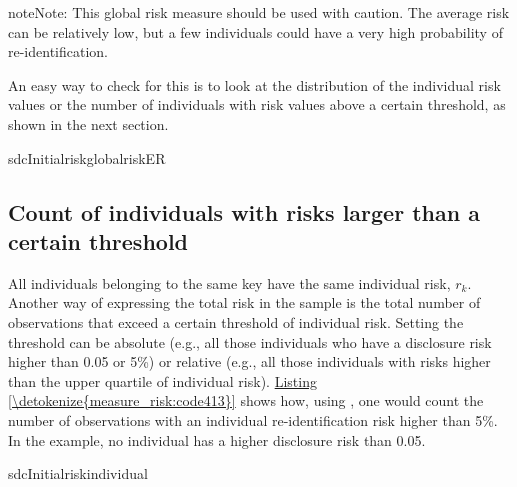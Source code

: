 \documentclass[letterpaper,10pt,english]{sphinxmanual}
\begin{document}
\begin{sphinxadmonition}{note}{Note:}
This global risk measure should be used with
caution. The average risk can be relatively low, but a few individuals
could have a very high probability of re-identification.
\end{sphinxadmonition}

An easy way to check for this is to look at the distribution of the individual risk
values or the number of individuals with risk values above a certain
threshold, as shown in the next section.

\def\sphinxLiteralBlockLabel{\label{\detokenize{measure_risk:code412}}}
%
\begin{sphinxVerbatim}[commandchars=\\\{\},numbers=left,firstnumber=1,stepnumber=1]
 sdcInitialriskglobalrisk\PYGZus{}ER
 \PYG{p}{[}\PYG{p}{]} 
\end{sphinxVerbatim}


\subsection{Count of individuals with risks larger than a certain threshold}
\label{\detokenize{measure_risk:count-of-individuals-with-risks-larger-than-a-certain-threshold}}
All individuals belonging to the same key have the same individual risk,
\(r_{k}\). Another way of expressing the total risk in the sample is
the total number of observations that exceed a certain threshold of
individual risk. Setting the threshold can be absolute (e.g., all those
individuals who have a disclosure risk higher than 0.05 or 5\%) or
relative (e.g., all those individuals with risks higher than the upper
quartile of individual risk). \hyperref[\detokenize{measure_risk:code413}]{Listing \ref{\detokenize{measure_risk:code413}}} shows how, using , one
would count the number of observations with an individual
re-identification risk higher than 5\%. In the example, no individual has
a higher disclosure risk than 0.05.

\def\sphinxLiteralBlockLabel{\label{\detokenize{measure_risk:code413}}}
%
\begin{sphinxVerbatim}[commandchars=\\\{\},numbers=left,firstnumber=1,stepnumber=1]
 sdcInitialriskindividual\PYG{p}{[}\PYG{p}{]}  
 \PYG{p}{[}\PYG{p}{]} 
\end{sphinxVerbatim}
\end{document}
